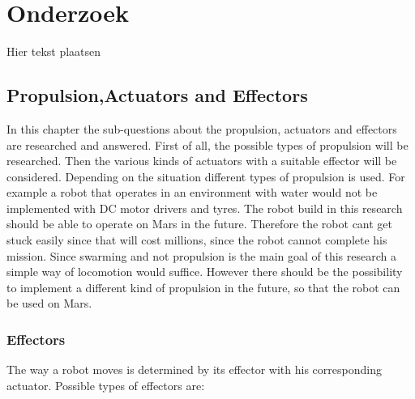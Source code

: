 \documentclass[10pt,a4paper]{article}
\begin{document}
\newpage

\section{Onderzoek}
Hier tekst plaatsen

\subsection{Propulsion,Actuators and Effectors}

In this chapter the sub-questions about the propulsion, actuators and effectors are researched and answered. First of all, the possible types of propulsion will be researched. Then the various kinds of actuators with a suitable effector will be considered. Depending on the situation different types of propulsion is used. For example a robot that operates in an environment with water would not be implemented with DC motor drivers and tyres. The robot build in this research should be able to operate on Mars in the future. Therefore the robot cant get stuck easily since that will cost millions, since the robot cannot complete his mission. Since swarming and not propulsion is the main goal of this research a simple way of locomotion would suffice. However there should be the possibility to implement a different kind of propulsion in the future, so that the robot can be used on Mars. 



\subsubsection{Effectors}
The way a robot moves is determined by its effector with his corresponding actuator. Possible types of effectors are:
\end{document}
